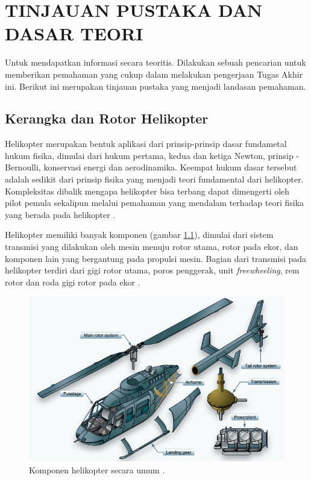 \chapter{TINJAUAN PUSTAKA DAN DASAR TEORI}
\label{chap:tinjauanpustaka}

\thispagestyle{newchap}
Untuk mendapatkan informasi secara teoritis. Dilakukan sebuah pencarian untuk memberikan pemahaman yang cukup dalam melakukan pengerjaan Tugas Akhir ini. Berikut ini merupakan tinjauan pustaka yang menjadi landasan pemahaman.

\section{Kerangka dan Rotor Helikopter}
\label{sec:strukturheli}

Helikopter merupakan bentuk aplikasi dari prinsip-prinsip dasar fundametal hukum fisika, dimulai dari hukum pertama, kedua dan ketiga Newton, prinsip \hyp{}Bernoulli, konservasi energi dan aerodinamika. Keempat hukum dasar tersebut adalah sedikit dari prinsip fisika yang menjadi teori fundamental dari helikopter. Kompleksitas dibalik mengapa helikopter bisa terbang dapat dimengerti oleh pilot pemula sekalipun melalui pemahaman yang mendalam terhadap teori fisika yang berada pada helikopter \cite{wagtendonk2006principles}.

Helikopter memiliki banyak komponen (gambar \ref{fig:komponenheli}), dimulai dari sistem transmisi yang dilakukan oleh mesin menuju rotor utama, rotor pada ekor, dan komponen lain yang bergantung pada propulsi mesin. Bagian dari transmisi pada helikopter terdiri dari gigi rotor utama, poros penggerak, unit \textit{freewheeling}, rem rotor dan roda gigi rotor pada ekor  \cite{wagtendonk2006principles}.

\begin{figure}[H]
	\centering
	\includegraphics[width=0.7\linewidth]{gambar/komponenheli.png}
	\caption{Komponen helikopter secara umum \cite{handbook}.}
	\label{fig:komponenheli}
\end{figure}


